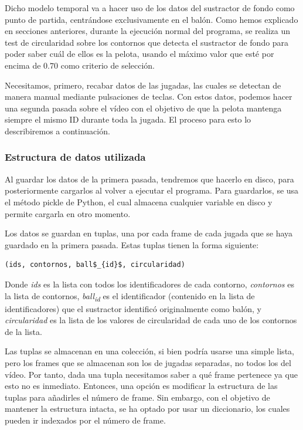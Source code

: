 Dicho modelo temporal va a hacer uso de los datos del sustractor de fondo como punto de partida, centrándose exclusivamente en el balón. Como hemos explicado en secciones anteriores, durante la ejecución normal del programa, se realiza un test de circularidad sobre los contornos que detecta el sustractor de fondo para poder saber cuál de ellos es la pelota, usando el máximo valor que esté por encima de $0.70$ como criterio de selección.

Necesitamos, primero, recabar datos de las jugadas, las cuales se detectan de manera manual mediante pulsaciones de teclas. Con estos datos, podemos hacer una segunda pasada sobre el vídeo con el objetivo de que la pelota mantenga siempre el mismo ID durante toda la jugada. El proceso para esto lo describiremos a continuación.

\subsubsection*{Estructura de datos utilizada}

Al guardar los datos de la primera pasada, tendremos que hacerlo en disco, para posteriormente cargarlos al volver a ejecutar el programa. Para guardarlos, se usa el método pickle de Python, el cual almacena cualquier variable en disco y permite cargarla en otro momento.

Los datos se guardan en tuplas, una por cada frame de cada jugada que se haya guardado en la primera pasada. Estas tuplas tienen la forma siguiente:
  
\begin{lstlisting}[mathescape]
  (ids, contornos, ball$_{id}$, circularidad)
\end{lstlisting}

Donde \textit{ids} es la lista con todos los identificadores de cada contorno, \textit{contornos} es la lista de contornos, \textit{ball\textsubscript{id}} es el identificador (contenido en la lista de identificadores) que el sustractor identificó originalmente como balón, y \textit{circularidad} es la lista de los valores de circularidad de cada uno de los contornos de la lista.

Las tuplas se almacenan en una colección, si bien podría usarse una simple lista, pero los frames que se almacenan son los de jugadas separadas, no todos los del vídeo. Por tanto, dada una tupla necesitamos saber a qué frame pertenece ya que esto no es inmediato. Entonces, una opción es modificar la estructura de las tuplas para añadirles el número de frame. Sin embargo, con el objetivo de mantener la estructura intacta, se ha optado por usar un diccionario, los cuales pueden ir indexados por el número de frame.

